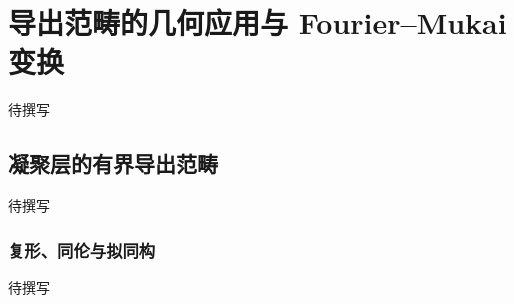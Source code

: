 
% 
% 
% 
% 
% 
% 
% 

\chapter{导出范畴的几何应用与 Fourier–Mukai 变换}
\label{g5:app:D}

待撰写

\section{凝聚层的有界导出范畴}
\label{g5:sec:D01}
待撰写

\subsection{复形、同伦与拟同构}
\label{g5:subsec:D01:01}
待撰写

